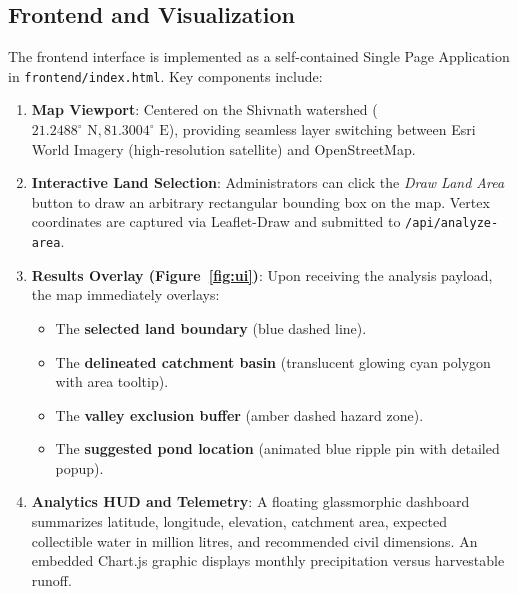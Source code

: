 \documentclass[manuscript,screen,nonacm]{acmart}
\begin{document}
\subsection{Frontend and Visualization}
The frontend interface is implemented as a self-contained Single Page Application in \texttt{frontend/index.html}. Key components include:
\begin{enumerate}
    \item \textbf{Map Viewport}: Centered on the Shivnath watershed ($21.2488^\circ\text{ N}, 81.3004^\circ\text{ E}$), providing seamless layer switching between Esri World Imagery (high-resolution satellite) and OpenStreetMap.
    \item \textbf{Interactive Land Selection}: Administrators can click the \textit{Draw Land Area} button to draw an arbitrary rectangular bounding box on the map. Vertex coordinates are captured via Leaflet-Draw and submitted to \texttt{/api/analyze-area}.
    \item \textbf{Results Overlay (Figure~\ref{fig:ui})}: Upon receiving the analysis payload, the map immediately overlays:
    \begin{itemize}
        \item The \textbf{selected land boundary} (blue dashed line).
        \item The \textbf{delineated catchment basin} (translucent glowing cyan polygon with area tooltip).
        \item The \textbf{valley exclusion buffer} (amber dashed hazard zone).
        \item The \textbf{suggested pond location} (animated blue ripple pin with detailed popup).
    \end{itemize}
    \item \textbf{Analytics HUD and Telemetry}: A floating glassmorphic dashboard summarizes latitude, longitude, elevation, catchment area, expected collectible water in million litres, and recommended civil dimensions. An embedded Chart.js graphic displays monthly precipitation versus harvestable runoff.
\end{enumerate}
\end{document}
